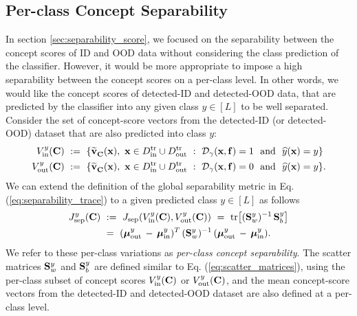 \subsection{Per-class Concept Separability}
\label{sec:appendix-perclass-separability}
In section \ref{sec:separability_score}, we focused on the separability between the concept scores of ID and OOD data without considering the class prediction of the classifier.
However, it would be more appropriate to impose a high separability between the concept scores on a per-class level. In other words, we would like the concept scores of detected-ID and detected-OOD data, that are predicted by the classifier into any given class $y \in [L]$ to be well separated.
Consider the set of concept-score vectors from the detected-ID (or detected-OOD) dataset that are also predicted into class $y$:
\begin{align}
V^{y}_{\textrm{in}}(\bfC) ~&:=~ \{\TVC(\bfx), ~\bfx \in \Dintr \cup \Douttr ~:~ \calD_\gamma(\bfx, \bff) = 1~ \text{ and } ~\widehat{y}(\bfx) = y\} \nonumber \\
%
V^{y}_{\textrm{out}}(\bfC) ~&:=~ \{\TVC(\bfx), ~\bfx \in \Dintr \cup \Douttr ~:~ \calD_\gamma(\bfx, \bff) = 0~ \text{ and } ~\widehat{y}(\bfx) = y\}.
\end{align}
We can extend the definition of the global separability metric in Eq. (\ref{eq:separability_trace}) to a given predicted class $y \in [L]$ as follows
\begin{align}
\label{eq:separability_trace_per_class}
J^y_{\textrm{sep}}(\mathbf{C}) ~&:=~ J_{\textrm{sep}}(V^{y}_{\textrm{in}}(\mathbf{C}), V^{y}_{\textrm{out}}(\mathbf{C})) ~=~ \textrm{tr}\big[(\mathbf{S}^{y}_w)^{-1} \,\mathbf{S}^y_b\big] \nonumber \\
&=~ (\bm{\mu}^y_{\textrm{out}} \,-\, \bm{\mu}^y_{\textrm{in}})^T \,(\mathbf{S}^y_w)^{-1} \,(\bm{\mu}^y_{\textrm{out}} \,-\, \bm{\mu}^y_{\textrm{in}}).
\end{align}
We refer to these per-class variations as \textit{per-class concept separability}.
The scatter matrices $\mathbf{S}^y_w$ and $\mathbf{S}^y_b$ are defined similar to Eq. (\ref{eq:scatter_matrices}), using the per-class subset of concept scores $V^{y}_{\textrm{in}}(\mathbf{C})$ or $V^{y}_{\textrm{out}}(\mathbf{C})$, and the mean concept-score vectors from the detected-ID and detected-OOD dataset are also defined at a per-class level.


